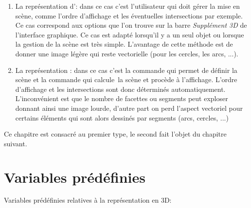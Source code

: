 \begin{enumerate}
 \item La représentation d': dans ce cas c'est l'utilisateur qui doit gérer la mise en scène, comme l'ordre d'affichage et les éventuelles intersections par exemple. Ce cas correspond aux options que l'on trouve sur la barre \textit{Supplément 3D} de l'interface graphique. Ce cas est adapté lorsqu'il y a un seul objet ou lorsque la gestion de la scène est très simple. L'avantage de cette méthode est de donner une image légère qui reste vectorielle (pour les cercles, les arcs, ...).
 \item La représentation : dans ce cas c'est la commande  qui permet de définir la scène et la commande  qui \og calcule\fg\ la scène et procède à l'affichage. L'ordre d'affichage et les intersections sont donc déterminés automatiquement. L'inconvénient est que le nombre de facettes ou segments peut exploser donnant ainsi une image lourde, d'autre part on perd l'aspect vectoriel pour certains éléments qui sont alors dessinés par segments (arcs, cercles, ...)
\end{enumerate}


Ce chapitre est consacré au premier type, le second fait l'objet du chapitre suivant.

\section{Variables prédéfinies}

Variables prédéfinies relatives à la représentation en 3D:


